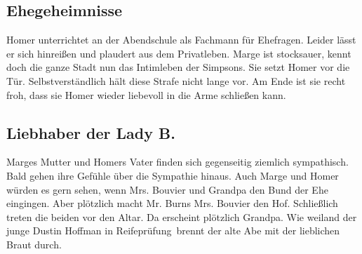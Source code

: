 \subsection{Ehegeheimnisse}\label{1F20}
Homer unterrichtet an der Abendschule als Fachmann für Ehefragen. Leider lässt er sich hinreißen und plaudert aus dem Privatleben. Marge ist stocksauer, kennt doch die ganze Stadt nun das Intimleben der Simpsons. Sie setzt Homer vor die Tür. Selbstverständlich hält diese Strafe nicht lange vor. Am Ende ist sie recht froh, dass sie Homer wieder liebevoll in die Arme schließen kann.


	
\subsection{Liebhaber der Lady B.}\label{1F21}
Marges Mutter und Homers Vater finden sich gegenseitig ziemlich sympathisch. Bald gehen ihre Gefühle über die Sympathie hinaus. Auch Marge und Homer würden es gern sehen, wenn Mrs. Bouvier und Grandpa den Bund der Ehe eingingen. Aber plötzlich macht Mr. Burns Mrs. Bouvier den Hof. Schließlich treten die beiden vor den Altar. Da erscheint plötzlich Grandpa. Wie weiland der junge Dustin Hoffman in \glqq Reifeprüfung\grqq\ brennt der alte Abe mit der lieblichen Braut durch.

